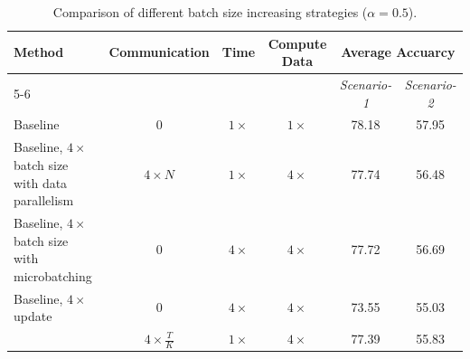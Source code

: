 \documentclass[sigconf]{acmart}
\newcommand\our{\text{FDLoRA}}
\begin{document}
\begin{table}[!tb]
\centering
\caption{Comparison of different batch size increasing strategies ($\alpha=0.5$).}
\label{tab:various_bs}
\begin{tabular}{lccccc} 
\toprule
\multirow{2}{*}{Method}                       & \multirow{2}{*}{Communication} & \multirow{2}{*}{Time} & \multirow{2}{*}{Compute  Data} & \multicolumn{2}{c}{Average Accuarcy}  \\
\cmidrule{5-6}
                                              &                                &                       &                                & \textit{Scenario-1} & \textit{Scenario-2 }      \\
\midrule
Baseline                                      & 0                              & $1\times$                    & $1\times$                             & 78.18      & 57.95            \\
Baseline, $4\times$ batch size with data parallelism & $4\times N$            & $1\times$                    & $4\times$                            & 77.74      & 56.48            \\
Baseline, $4\times$batch size with
  microbatching   & 0                              & $4\times$                    & $4\times$                            & 77.72      & 56.69            \\
Baseline, $4\times$update                            & 0                              & $4\times$                   & $4\times$                             & 73.55      & 55.03            \\
\our{}                                     & $4\times \frac{T}{K}$                          & $1\times$                    & $4\times$                             & 77.39      & 55.83            \\
\bottomrule
\end{tabular}
\end{table}

\end{document}
